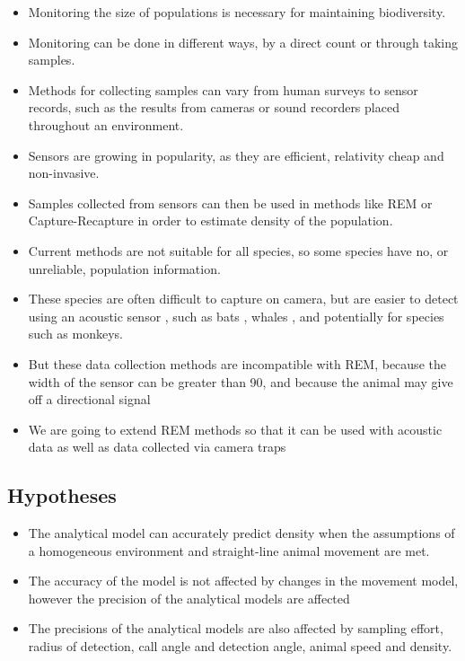 \documentclass[a4paper,10pt,reqno,oneside]{amsart}
\begin{document}
\begin{itemize}
\item Monitoring the size of populations is necessary for maintaining biodiversity.
\item Monitoring can be done in different ways, by a direct count or through taking samples. \citep{pollock2002large}
\item Methods for collecting samples can vary from human surveys to sensor records, such as the results from cameras or sound recorders placed throughout an environment. 
\item Sensors are growing in popularity, as they are efficient, relativity cheap and non-invasive. \citep{gese2001monitoring}
\item Samples collected from sensors can then be used in methods like REM or Capture-Recapture in order to estimate density of the population.
\item Current methods are not suitable for all species, so some species have no, or unreliable, population information. 
\item These species are often difficult to capture on camera, but are easier to detect using an acoustic sensor \citep{rogers2013density}, such as bats \citep{ofarrel1999comparison}, whales \citep{mcdonald1999passive}, and potentially for species such as monkeys. 
\item But these data collection methods are incompatible with REM, because the width of the sensor can be greater than 90, and because the animal may give off a directional signal 
\item We are going to extend REM methods so that it can be used with acoustic data as well as data collected via camera traps
\end{itemize}

\subsection{Hypotheses}

\begin{itemize}
\item The analytical model can accurately predict density when the assumptions of a homogeneous environment and straight-line animal movement are met.
\item The accuracy of the model is not affected by changes in the movement model, however the precision of the analytical models are affected
\item The precisions of the analytical models are also affected by sampling effort, radius of detection, call angle and detection angle, animal speed and density.
\end{itemize}
\end{document}
